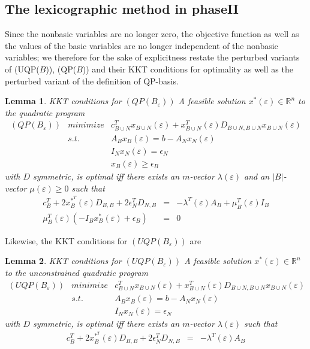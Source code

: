 \documentclass[a4paper]{article}
\newtheorem{lemma}{Lemma}
\begin{document}
\subsection{The lexicographic method in phaseII}
Since the nonbasic variables are no longer zero, the objective function as well as
the values of the basic variables are no longer independent of the nonbasic
variables; we therefore for the sake of explicitness restate the perturbed
variants of (UQP($B$)), (QP($B$)) and their KKT conditions for optimality
as well as the perturbed variant of the definition of QP-basis.

\begin{lemma}{KKT conditions for $(QP(B_{\varepsilon}))$}
\label{lemma:KKT_QP(B)_epsilon}
A feasible solution $x^{*}(\varepsilon) \in \mathbb{R}^{n}$ to the quadratic
program
\begin{eqnarray*}
  \mbox{$(QP(B_{\varepsilon}))$} & minimize & c_{B \cup N}^{T}
    x_{B \cup N}(\varepsilon)
    + x_{B \cup N}^{T}(\varepsilon) 
    D_{B \cup N, B \cup N} x_{B \cup N}(\varepsilon) \\
    & s.t. & A_{B}x_{B}(\varepsilon) = b - A_{N}x_{N}(\varepsilon)  \\
    & & I_{N}x_{N}(\varepsilon) = \epsilon_{N}  \\
    & & x_{B}(\varepsilon) \geq \epsilon_{B}
\end{eqnarray*}
with $D$ symmetric, is optimal iff there exists an $m$-vector
$\lambda(\varepsilon)$ and an $\left|B\right|$-vector $\mu(\varepsilon) \geq 0$
such that
\begin{eqnarray}
  c_{B}^{T} + 2x_{B}^{*^{\scriptstyle{T}}}(\varepsilon)D_{B,B} +
  2\epsilon_{N}^{T}D_{N,B} & = &
  -\lambda^{T}(\varepsilon)A_{B} + \mu_{B}^{T}(\varepsilon)I_{B} \\
  \mu_{B}^{T}(\varepsilon) \left( -I_{B}x_{B}^{*}(\varepsilon) +
    \epsilon_{B} \right) & = & 0
\end{eqnarray}
\end{lemma}

Likewise, the KKT conditions for $(UQP(B_{\varepsilon}))$ are
\begin{lemma}{KKT conditions for $(UQP(B_{\varepsilon}))$}
\label{lemma:KKT_UQP(B)_epsilon}
A feasible solution $x^{*}(\varepsilon) \in \mathbb{R}^{n}$ to the
unconstrained quadratic program
\begin{eqnarray*}
  \mbox{$(UQP(B_{\varepsilon}))$} & minimize & c_{B \cup N}^{T}
    x_{B \cup N}(\varepsilon)
    + x_{B \cup N}^{T}(\varepsilon) D_{B \cup N, B \cup N}
    x_{B \cup N}(\varepsilon) \\
    & s.t. & A_{B}x_{B}(\varepsilon) = b - A_{N}x_{N}(\varepsilon)  \\
    & & I_{N}x_{N}(\varepsilon) = \epsilon_{N}  
\end{eqnarray*}
with $D$ symmetric, is optimal iff there exists an $m$-vector
$\lambda(\varepsilon)$ such that
\begin{eqnarray}
  c_{B}^{T} + 2x_{B}^{*^{\scriptstyle{T}}}(\varepsilon)D_{B,B} +
  2\epsilon_{N}^{T}D_{N,B} & = &
    -\lambda^{T}(\varepsilon)A_{B}
\end{eqnarray}
\end{lemma}
\end{document}
